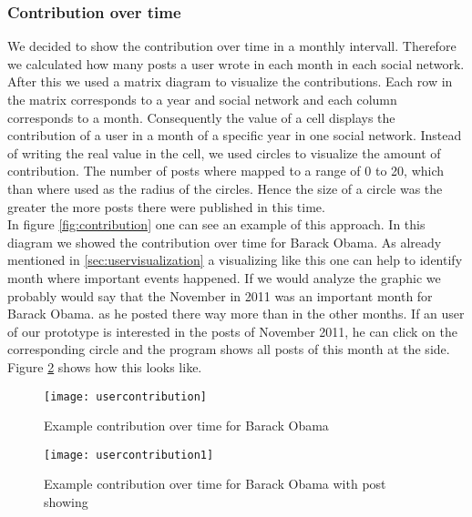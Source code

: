 \subsubsection{Contribution over time}
We decided to show the contribution over time in a monthly intervall. Therefore we calculated how many posts a user wrote in each month in each social network. 
After this we  used a matrix diagram to visualize the contributions. Each row in the matrix corresponds to a year and social network and each column corresponds to a month. Consequently the value of a cell displays the contribution of a user in a month of a specific year in one social network. Instead of writing the real value in the cell, we used circles to visualize the amount of contribution. The number of posts where mapped to a range of 0 to 20, which than where used as the radius of the circles. Hence the size of a circle was the greater the more posts there were published in this time.  \\
In figure \ref{fig:contribution} one can see an example of this approach. In this diagram we showed the contribution over time for Barack Obama. As already mentioned in \ref{sec:uservisualization} a visualizing like this one can help to identify month where important events happened. If we would analyze the graphic we probably would say that the November in 2011 was an important month for Barack Obama. as he posted there way more than in the other months. If an user of our prototype is interested in the posts of November 2011, he can click on the corresponding circle and the program shows all posts of this month at the side. Figure \ref{fig:contributon2} shows how this looks like.  

\begin{figure}[t]
	\centering
	\texttt{[image: usercontribution]}
	\caption[ContributonOverTime]{Example contribution over time for Barack Obama}
	\label{fig:contributon}
\end{figure}

\begin{figure}[t]
	\centering
	\texttt{[image: usercontribution1]}
	\caption[ContributonOverTime]{Example contribution over time for Barack Obama with post showing}
	\label{fig:contributon2}
\end{figure}

